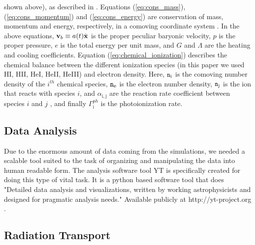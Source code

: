 \documentclass[letterpaper,10pt]{article}
\renewcommand{\(}{\left(}
\renewcommand{\)}{\right)}
\newcommand{\vb}{{\bf v}_b}
\newcommand{\xvec}{{\bf x}}
\newcommand{\mn}{{\tt n}}
\begin{document}
shown above), as described in 
\citealt{HockneyEastwood1988, NormanBryan1999, OSheaEtAl2004}. 
Equations (\ref{eq:cons_mass}), (\ref{eq:cons_momentum}) and
(\ref{eq:cons_energy}) are conservation of mass, momentum and energy,
respectively, in a comoving coordinate system \citep{BryanEtAl1995}.
In the above equations, $\vb\equiv a(t)\dot{\xvec}$ is the proper
peculiar baryonic velocity, $p$ is the proper pressure, $e$ is the
total energy per unit mass, and $G$ and $\Lambda$ are the heating and
cooling coefficients.  Equation (\ref{eq:chemical_ionization})
describes the chemical balance between the different ionization
species (in this paper we used H{\footnotesize I}, 
H{\footnotesize II}, He{\footnotesize I}, He{\footnotesize II}, 
He{\footnotesize III}) and electron density. Here, $\mn_\mathrm{i}$ is the
comoving number density of the $i^{th}$ chemical species, $\mn_\mathrm{e}$ is
the electron number density, $\mn_\mathrm{j}$ is the ion that reacts with
species $i$, and $\alpha_\mathrm{i,j}$ are the reaction rate coefficient
between species $i$ and $j$ \citep{AbelEtAl1997, HuiGnedin1997}, and
finally $\Gamma^{ph}_\mathrm{i}$ is the photoionization rate. 

\subsection{Data Analysis}

Due to the enormous amount of data coming from the simulations, 
we needed a scalable tool suited to the task of organizing and manipulating
the data into human readable form.  The analysis software tool YT is specifically created for doing this type of vital task.  It is a python based software tool that does "Detailed data analysis and visualizations, 
written by working astrophysicists and designed for pragmatic analysis needs."
Available publicly at http://yt-project.org \citep{TurkEtAl2011}.

\subsection{Radiation Transport}
\end{document}
